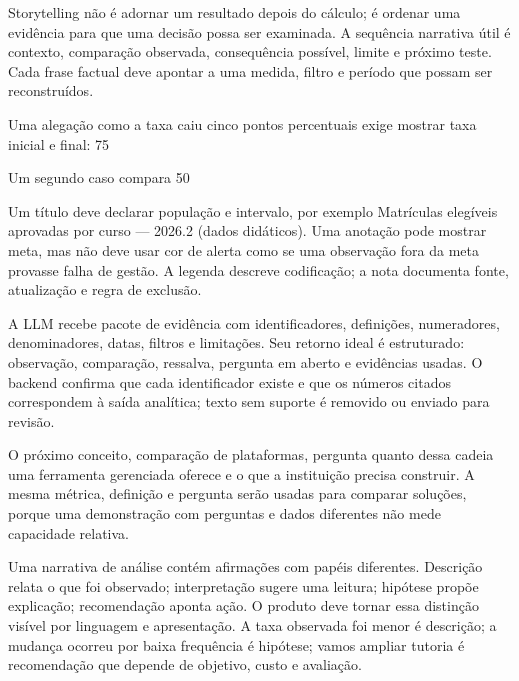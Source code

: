 Storytelling não é adornar um resultado depois do cálculo; é ordenar uma evidência para que uma decisão possa ser examinada. A sequência narrativa útil é contexto, comparação observada, consequência possível, limite e próximo teste. Cada frase factual deve apontar a uma medida, filtro e período que possam ser reconstruídos.

Uma alegação como a taxa caiu cinco pontos percentuais exige mostrar taxa inicial e final: 75%

Um segundo caso compara 50%

Um título deve declarar população e intervalo, por exemplo Matrículas elegíveis aprovadas por curso --- 2026.2 (dados didáticos). Uma anotação pode mostrar meta, mas não deve usar cor de alerta como se uma observação fora da meta provasse falha de gestão. A legenda descreve codificação; a nota documenta fonte, atualização e regra de exclusão.

A LLM recebe pacote de evidência com identificadores, definições, numeradores, denominadores, datas, filtros e limitações. Seu retorno ideal é estruturado: observação, comparação, ressalva, pergunta em aberto e evidências usadas. O backend confirma que cada identificador existe e que os números citados correspondem à saída analítica; texto sem suporte é removido ou enviado para revisão.

O próximo conceito, comparação de plataformas, pergunta quanto dessa cadeia uma ferramenta gerenciada oferece e o que a instituição precisa construir. A mesma métrica, definição e pergunta serão usadas para comparar soluções, porque uma demonstração com perguntas e dados diferentes não mede capacidade relativa.

Uma narrativa de análise contém afirmações com papéis diferentes. Descrição relata o que foi observado; interpretação sugere uma leitura; hipótese propõe explicação; recomendação aponta ação. O produto deve tornar essa distinção visível por linguagem e apresentação. A taxa observada foi menor é descrição; a mudança ocorreu por baixa frequência é hipótese; vamos ampliar tutoria é recomendação que depende de objetivo, custo e avaliação.

